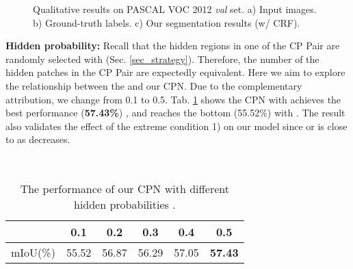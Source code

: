 \documentclass[10pt,twocolumn,letterpaper]{article}
\begin{document}
\begin{figure*}[htbp]
\hspace{-4.5mm}
\centering
\caption{Qualitative results on PASCAL VOC 2012 \textit{val} set. a) Input images. b) Ground-truth labels. c) Our segmentation results (w/ CRF).}
\label{fig:compare_sota}
\end{figure*}

\noindent\textbf{Hidden probability:}\; Recall that the hidden regions in one of the CP Pair are randomly selected with  (Sec. \ref{sec_strategy}). Therefore, the number of the hidden patches in the CP Pair are expectedly equivalent. Here we aim to explore the relationship between the  and our CPN. Due to the complementary attribution, we change  from 0.1 to 0.5. Tab. \ref{tab:ablation on ph} shows the CPN with  achieves the best performance (\textbf{57.43\%}) , and reaches the bottom (55.52\%) with . The result also validates the effect of the extreme condition 1) on our model since  or  is close to  as  decreases.
\begin{table}[!htbp]\small
\centering\
\begin{tabular}{c|c|c|c|c|c}
\hline
 & 0.1 & 0.2 & 0.3  & 0.4 & 0.5\\
\hline
mIoU(\%) & 55.52 & 56.87 & 56.29 & 57.05 &\textbf{57.43} \\
\hline
\end{tabular}
\caption{The performance of our CPN with different hidden probabilities . }
\label{tab:ablation on ph}
\vspace{-2mm}
\end{table}
\end{document}
